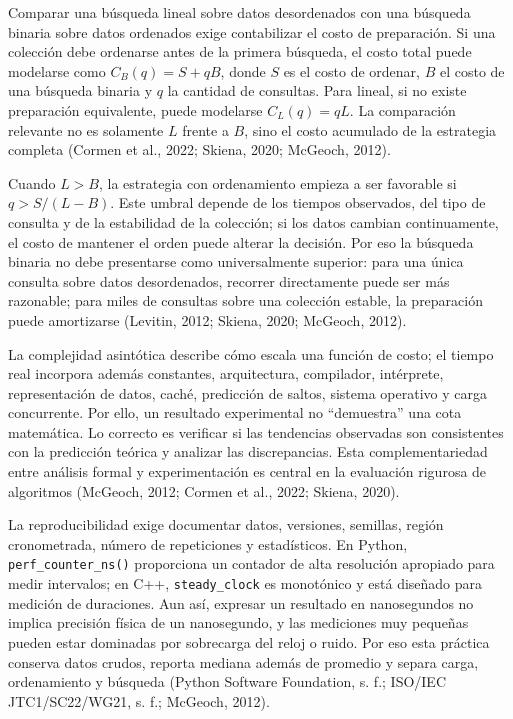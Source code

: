 Comparar una búsqueda lineal sobre datos desordenados con una búsqueda binaria sobre datos ordenados exige contabilizar el costo de preparación. Si una colección debe ordenarse antes de la primera búsqueda, el costo total puede modelarse como $C_B(q)=S+qB$, donde $S$ es el costo de ordenar, $B$ el costo de una búsqueda binaria y $q$ la cantidad de consultas. Para lineal, si no existe preparación equivalente, puede modelarse $C_L(q)=qL$. La comparación relevante no es solamente $L$ frente a $B$, sino el costo acumulado de la estrategia completa (Cormen et al., 2022; Skiena, 2020; McGeoch, 2012).

Cuando $L>B$, la estrategia con ordenamiento empieza a ser favorable si $q>S/(L-B)$. Este umbral depende de los tiempos observados, del tipo de consulta y de la estabilidad de la colección; si los datos cambian continuamente, el costo de mantener el orden puede alterar la decisión. Por eso la búsqueda binaria no debe presentarse como universalmente superior: para una única consulta sobre datos desordenados, recorrer directamente puede ser más razonable; para miles de consultas sobre una colección estable, la preparación puede amortizarse (Levitin, 2012; Skiena, 2020; McGeoch, 2012).

La complejidad asintótica describe cómo escala una función de costo; el tiempo real incorpora además constantes, arquitectura, compilador, intérprete, representación de datos, caché, predicción de saltos, sistema operativo y carga concurrente. Por ello, un resultado experimental no ``demuestra'' una cota matemática. Lo correcto es verificar si las tendencias observadas son consistentes con la predicción teórica y analizar las discrepancias. Esta complementariedad entre análisis formal y experimentación es central en la evaluación rigurosa de algoritmos (McGeoch, 2012; Cormen et al., 2022; Skiena, 2020).

La reproducibilidad exige documentar datos, versiones, semillas, región cronometrada, número de repeticiones y estadísticos. En Python, \texttt{perf\_counter\_ns()} proporciona un contador de alta resolución apropiado para medir intervalos; en C++, \texttt{steady\_clock} es monotónico y está diseñado para medición de duraciones. Aun así, expresar un resultado en nanosegundos no implica precisión física de un nanosegundo, y las mediciones muy pequeñas pueden estar dominadas por sobrecarga del reloj o ruido. Por eso esta práctica conserva datos crudos, reporta mediana además de promedio y separa carga, ordenamiento y búsqueda (Python Software Foundation, s. f.; ISO/IEC JTC1/SC22/WG21, s. f.; McGeoch, 2012).


